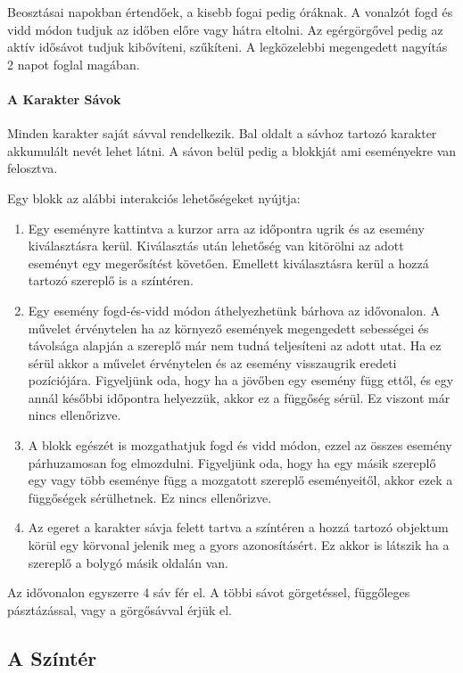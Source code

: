 Beosztásai napokban értendőek, a kisebb fogai pedig óráknak. A vonalzót fogd és vidd módon tudjuk az időben előre vagy hátra eltolni. Az egérgörgővel pedig az aktív idősávot tudjuk kibővíteni, szűkíteni. A legközelebbi megengedett nagyítás 2 napot foglal magában.

\paragraph{A Karakter Sávok}

Minden karakter saját sávval rendelkezik. Bal oldalt a sávhoz tartozó karakter akkumulált nevét lehet látni. A sávon belül pedig a blokkját ami eseményekre van felosztva.

Egy blokk az alábbi interakciós lehetőségeket nyújtja:
\begin{enumerate}
	\item Egy eseményre kattintva a kurzor arra az időpontra ugrik és az esemény kiválasztásra kerül. Kiválasztás után lehetőség van kitörölni az adott eseményt egy megerősítést követően. Emellett kiválasztásra kerül a hozzá tartozó szereplő is a színtéren.
	\item Egy esemény fogd-és-vidd módon áthelyezhetünk bárhova az idővonalon. A művelet érvénytelen ha az környező események megengedett sebességei és távolsága alapján a szereplő már nem tudná teljesíteni az adott utat. Ha ez sérül akkor a művelet érvénytelen és az esemény visszaugrik eredeti pozíciójára. Figyeljünk oda, hogy ha a jövőben egy esemény függ ettől, és egy annál későbbi időpontra helyezzük, akkor ez a függőség sérül. Ez viszont már nincs ellenőrizve.
	\item A blokk egészét is mozgathatjuk fogd és vidd módon, ezzel az összes esemény párhuzamosan fog elmozdulni. Figyeljünk oda, hogy ha egy másik szereplő egy vagy több eseménye függ a mozgatott szereplő eseményeitől, akkor ezek a függőségek sérülhetnek. Ez nincs ellenőrizve.
	\item Az egeret a karakter sávja felett tartva a színtéren a hozzá tartozó objektum körül egy körvonal jelenik meg a gyors azonosításért. Ez akkor is látszik ha a szereplő a bolygó másik oldalán van.
\end{enumerate}

Az idővonalon egyszerre 4 sáv fér el. A többi sávot görgetéssel, függőleges pásztázással, vagy a görgősávval érjük el.

\subsection{A Színtér} \label{section:ui-scene}

